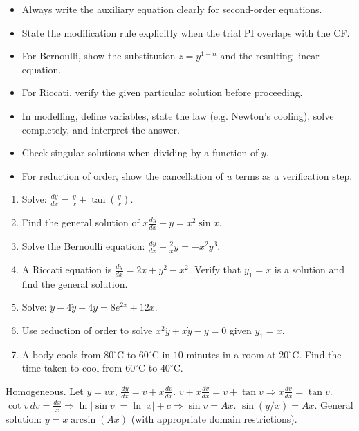 \documentclass[11pt]{article}
\begin{document}
\begin{aretenir}
\begin{itemize}
\item Always write the auxiliary equation clearly for second-order equations.
\item State the modification rule explicitly when the trial PI overlaps with the CF.
\item For Bernoulli, show the substitution $z=y^{1-n}$ and the resulting linear equation.
\item For Riccati, verify the given particular solution before proceeding.
\item In modelling, define variables, state the law (e.g. Newton's cooling), solve completely, and interpret the answer.
\item Check singular solutions when dividing by a function of $y$.
\item For reduction of order, show the cancellation of $u$ terms as a verification step.
\end{itemize}
\end{aretenir}

\begin{exercice}
\begin{enumerate}
\item Solve: $\frac{dy}{dx} = \frac{y}{x} + \tan\left(\frac{y}{x}\right)$.
\item Find the general solution of $x\frac{dy}{dx} - y = x^2 \sin x$.
\item Solve the Bernoulli equation: $\frac{dy}{dx} - \frac{2}{x}y = -x^2 y^3$.
\item A Riccati equation is $\frac{dy}{dx} = 2x + y^2 - x^2$. Verify that $y_1=x$ is a solution and find the general solution.
\item Solve: $\ddot{y} - 4\dot{y} + 4y = 8e^{2x} + 12x$.
\item Use reduction of order to solve $x^2\ddot{y} + x\dot{y} - y = 0$ given $y_1=x$.
\item A body cools from $80^\circ$C to $60^\circ$C in $10$ minutes in a room at $20^\circ$C. Find the time taken to cool from $60^\circ$C to $40^\circ$C.
\end{enumerate}
\end{exercice}

\begin{corrige}[Exercise 1]
Homogeneous. Let $y=vx$, $\frac{dy}{dx}=v+x\frac{dv}{dx}$.
$v+x\frac{dv}{dx} = v + \tan v \Rightarrow x\frac{dv}{dx} = \tan v$.
$\cot v\,dv = \frac{dx}{x} \Rightarrow \ln|\sin v| = \ln|x| + c \Rightarrow \sin v = Ax$.
$\sin(y/x) = Ax$. General solution: $\boxed{y = x \arcsin(Ax)}$ (with appropriate domain restrictions).
\end{corrige}
\end{document}
